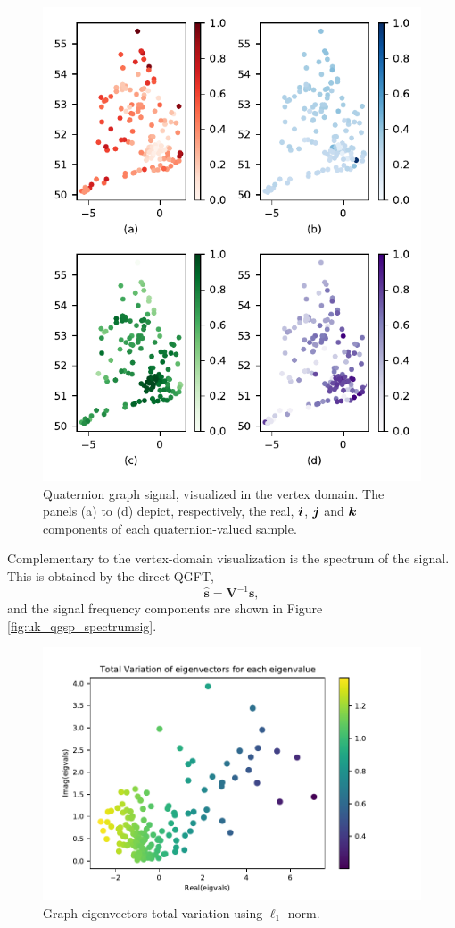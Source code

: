 \begin{figure}
	\centering
	\includegraphics[width=0.5\linewidth]{thesis/Figures/uk_signal.pdf}
	\caption{Quaternion graph signal, visualized in the vertex domain. The panels (a) to (d) depict, respectively, the real, $\boldsymbol{i}$, $\boldsymbol{j}$ and $\boldsymbol{k}$ components of each quaternion-valued sample.}
	\label{fig:uk_qgsp_graphsig}
\end{figure}

 Complementary to the vertex-domain visualization is the spectrum of the signal. This is obtained by the direct QGFT,
\begin{equation}
\widehat{\mathbf{s}} = \mathbf{V}^{-1} \mathbf{s},
\end{equation}
and the signal frequency components are shown in Figure \ref{fig:uk_qgsp_spectrumsig}.

\begin{figure}
	\centering
	\includegraphics[width=0.7\linewidth]{thesis/Figures/uk_qgft_tv1.pdf}
	\caption{Graph eigenvectors total variation using $\ell_1$-norm.}
	\label{fig:uk_qgft_tv1}
\end{figure}

